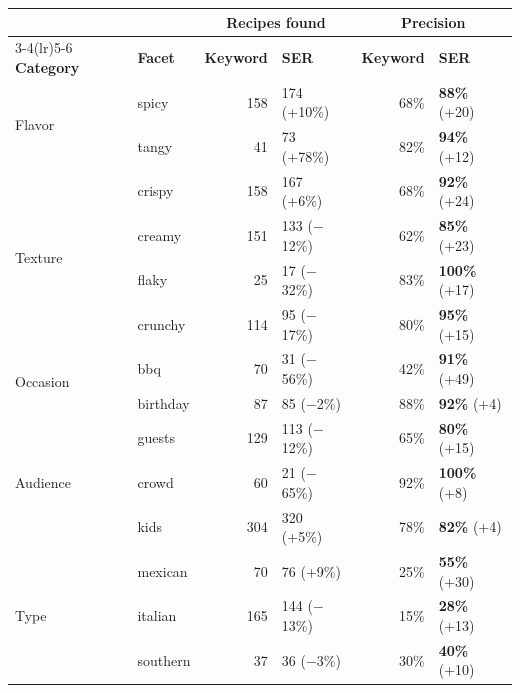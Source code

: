 \begin{table}[t]
\centering
\small
\setlength{\tabcolsep}{6pt}
\begin{tabular}{@{}ll rl rl@{}}
\toprule
& & \multicolumn{2}{c}{\textbf{Recipes found}} & \multicolumn{2}{c}{\textbf{Precision}} \\
\cmidrule(lr){3-4}\cmidrule(lr){5-6}
\textbf{Category} & \textbf{Facet} & \textbf{Keyword} & \textbf{SER} & \textbf{Keyword} & \textbf{SER} \\
\midrule
\multirow{2}{*}{Flavor}   & spicy   & 158 & 174 (+10\%) & 68\% & \textbf{88\%} (+20) \\
                          & tangy   & 41  & 73 (+78\%)  & 82\% & \textbf{94\%} (+12) \\
\midrule
\multirow{4}{*}{Texture}  & crispy  & 158 & 167 (+6\%)    & 68\% & \textbf{92\%} (+24) \\
                          & creamy  & 151 & 133 ($-$12\%) & 62\% & \textbf{85\%} (+23) \\
                          & flaky   & 25  & 17 ($-$32\%)  & 83\% & \textbf{100\%} (+17) \\
                          & crunchy & 114 & 95 ($-$17\%)  & 80\% & \textbf{95\%} (+15) \\
\midrule
\multirow{2}{*}{Occasion} & bbq      & 70 & 31 ($-$56\%) & 42\% & \textbf{91\%} (+49) \\
                          & birthday & 87 & 85 ($-$2\%)  & 88\% & \textbf{92\%} (+4) \\
\midrule
\multirow{3}{*}{Audience} & guests & 129 & 113 ($-$12\%) & 65\% & \textbf{80\%} (+15) \\
                          & crowd  & 60  & 21 ($-$65\%)  & 92\% & \textbf{100\%} (+8) \\
                          & kids   & 304 & 320 (+5\%)    & 78\% & \textbf{82\%} (+4) \\
\midrule
\multirow{3}{*}{Type}     & mexican  & 70  & 76 (+9\%)    & 25\% & \textbf{55\%} (+30) \\
                          & italian  & 165 & 144 ($-$13\%) & 15\% & \textbf{28\%} (+13) \\
                          & southern & 37  & 36 ($-$3\%)   & 30\% & \textbf{40\%} (+10) \\
\bottomrule
\end{tabular}

\end{table}
